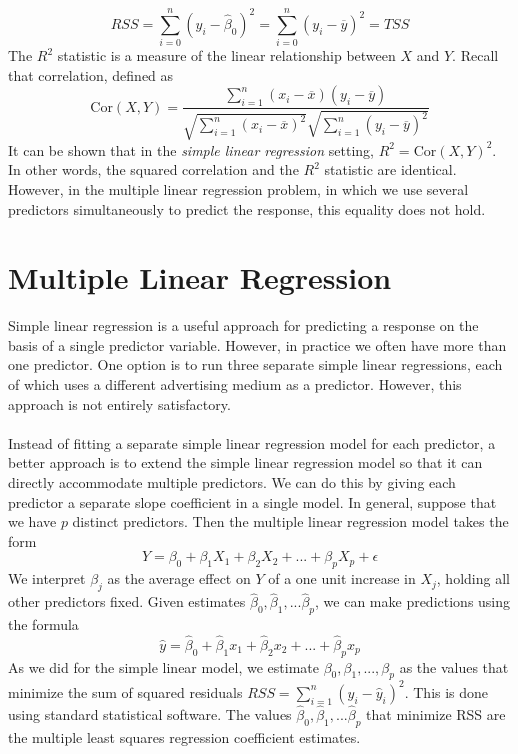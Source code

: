 \[RSS = \sum_{i=0}^n (y_i - \hat\beta_0)^2 = \sum_{i=0}^n (y_i - \overline{y})^2 = TSS\]
The $R^2$ statistic is a measure of the linear relationship between $X$ and
$Y$. Recall that correlation, defined as
\[\text{Cor}(X,Y) = \frac{\sum_{i=1}^n (x_i - \overline{x})(y_i - \overline{y})}{\sqrt{\sum_{i=1}^n (x_i - \overline{x})^2} \sqrt{\sum_{i=1}^n (y_i - \overline{y})^2}}\]
It can be shown that in the \textit{simple linear regression} setting, $R^2 = \text{Cor}(X,Y)^2$. In other words, the squared correlation and the $R^2$ statistic are identical. However, in the multiple linear regression problem, in which we use several predictors simultaneously to predict the response, this equality does not hold.

\section{Multiple Linear Regression}
Simple linear regression is a useful approach for predicting a response on the basis of a single predictor variable. However, in practice we often have more than one predictor. One option is to run three separate simple linear regressions, each of which uses a different advertising medium as a predictor. However, this approach is not entirely satisfactory.\\\\
Instead of fitting a separate simple linear regression model for each predictor, a better approach is to extend the simple linear regression model so that it can directly accommodate multiple predictors. We can do this by giving each predictor a separate slope coefficient in a single model. In general, suppose that we have $p$ distinct predictors. Then the multiple linear regression model takes the form
\[Y = \beta_0 + \beta_1 X_1 + \beta_2 X_2 + ... + \beta_p X_p + \epsilon\]
We interpret $\beta_j$ as the average effect on $Y$ of a one unit increase in $X_j$, holding all other predictors fixed. Given estimates $\hat\beta_0, \hat\beta_1, . . . \hat\beta_p$, we can make predictions using the formula
\[\hat{y} = \hat\beta_0 + \hat\beta_1 x_1 + \hat\beta_2 x_2 + ... + \hat\beta_p x_p\]
As we did for the simple linear model, we estimate $\beta_0, \beta_1, . . . , \beta_p$ as the values that minimize the sum of squared residuals $RSS = \sum_{i=1}^n (y_i - \hat{y}_i)^2$.
This is done using standard statistical software. The values $\hat\beta_0, \hat\beta_1, . . . \hat\beta_p$ that minimize RSS are the multiple least squares regression coefficient estimates.

